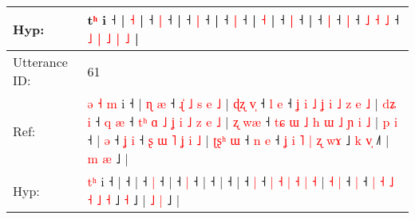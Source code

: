 \documentclass[10pt]{article}
\DeclareRobustCommand{\hl}[1]{{\textcolor{red}{#1}}}
\begin{document}
\begin{longtable}{ll}
 \\
Hyp: & \hl{}\hl{}\hl{}\hl{}\hl{}\hl{}\hl{}\hl{}\hl{}\hl{}\hl{}\hl{}\hl{}\hl{}\hl{}\hl{}\hl{}\hl{}\hl{}\hl{}\hl{}\hl{}t\hl{}\hl{}\hl{}\hl{}\hl{}\hl{}\hl{ʰ} i ˧\hl{}\hl{}\hl{}\hl{}\hl{}\hl{}\hl{}\hl{}\hl{}\hl{}\hl{}\hl{}\hl{}\hl{}\hl{}\hl{}\hl{}\hl{} |\hl{}\hl{}\hl{}\hl{}\hl{}\hl{}\hl{}\hl{} \hl{˧} |\hl{}\hl{}\hl{}\hl{}\hl{}\hl{} ˧\hl{}\hl{} \hl{|} ˧ |\hl{}\hl{}\hl{}\hl{} ˧\hl{}\hl{} \hl{}\hl{|} ˧ |\hl{}\hl{}\hl{}\hl{} ˧\hl{}\hl{} \hl{|} ˧\hl{}\hl{}\hl{}\hl{}\hl{} |\hl{}\hl{}\hl{}\hl{}\hl{}\hl{}\hl{}\hl{}\hl{}\hl{}\hl{}\hl{}\hl{}\hl{}\hl{}\hl{}\hl{} \hl{˧} |\hl{}\hl{}\hl{}\hl{} ˧\hl{}\hl{} \hl{|} ˧\hl{}\hl{}\hl{}\hl{}\hl{} |\hl{}\hl{}\hl{}\hl{}\hl{} ˧\hl{}\hl{}\hl{} \hl{}\hl{|} ˧\hl{}\hl{} \hl{}\hl{|} ˧ \hl{˩} \hl{˧} \hl{˩} ˧ \hl{˩} \hl{|} \hl{˩} \hl{}\hl{|} \hl{˩} |
 \\
\midrule
Utterance ID: & 61 \\
Ref: & \hl{ə}\hl{ }\hl{˧}\hl{ }\hl{m} i ˧ |\hl{ }\hl{ɳ}\hl{ }\hl{æ} ˧\hl{ }\hl{ɻ}\hl{̍}\hl{ }\hl{˩}\hl{ }\hl{s}\hl{ }\hl{e}\hl{ }\hl{˩} |\hl{ }\hl{ɖ}\hl{ʐ}\hl{ }\hl{v}\hl{̩} ˧\hl{ }\hl{l} \hl{e} ˧\hl{ }\hl{ʝ}\hl{ }\hl{i}\hl{ }\hl{˩}\hl{ }\hl{ʝ}\hl{ }\hl{i}\hl{ }\hl{˩}\hl{ }\hl{z}\hl{ }\hl{e}\hl{ }\hl{˩} |\hl{ }\hl{d}\hl{ʑ}\hl{ }\hl{i} ˧\hl{ }\hl{q} \hl{æ} ˧\hl{ }\hl{t}\hl{ʰ}\hl{ }\hl{ɑ}\hl{ }\hl{˩}\hl{ }\hl{ʝ}\hl{ }\hl{i}\hl{ }\hl{˩}\hl{ }\hl{z}\hl{ }\hl{e}\hl{ }\hl{˩} |\hl{ }\hl{ʐ}\hl{ }\hl{w}\hl{æ} ˧\hl{ }\hl{t}\hl{ɕ}\hl{ }\hl{ɯ}\hl{ }\hl{˩}\hl{ }\hl{h}\hl{ }\hl{ɯ}\hl{ }\hl{˩}\hl{ }\hl{ɲ}\hl{ }\hl{i}\hl{ }\hl{˩} |\hl{ }\hl{p}\hl{ }\hl{i} ˧ |\hl{ }\hl{ə} ˧\hl{ }\hl{ʝ} \hl{i} ˧ \hl{ʂ} \hl{ɯ} \hl{˥} \hl{ʝ} \hl{i} \hl{˩} | \hl{ʈ}\hl{ʂ}\hl{ʰ} \hl{ɯ} ˧\hl{ }\hl{n} \hl{e} ˧ \hl{ʝ} \hl{i} \hl{˥} \hl{|} \hl{ʐ} \hl{w}\hl{ɤ} ˩\hl{ }\hl{k} \hl{v}\hl{̩} ˩\hl{˥} | \hl{m} \hl{æ} ˩ |
 \\
Hyp: & \hl{}\hl{}\hl{}\hl{t}\hl{ʰ} i ˧ |\hl{}\hl{}\hl{}\hl{} ˧\hl{}\hl{}\hl{}\hl{}\hl{}\hl{}\hl{}\hl{}\hl{}\hl{}\hl{} |\hl{}\hl{}\hl{}\hl{}\hl{}\hl{} ˧\hl{}\hl{} \hl{|} ˧\hl{}\hl{}\hl{}\hl{}\hl{}\hl{}\hl{}\hl{}\hl{}\hl{}\hl{}\hl{}\hl{}\hl{}\hl{}\hl{}\hl{}\hl{} |\hl{}\hl{}\hl{}\hl{}\hl{} ˧\hl{}\hl{} \hl{|} ˧\hl{}\hl{}\hl{}\hl{}\hl{}\hl{}\hl{}\hl{}\hl{}\hl{}\hl{}\hl{}\hl{}\hl{}\hl{}\hl{}\hl{}\hl{}\hl{} |\hl{}\hl{}\hl{}\hl{}\hl{} ˧\hl{}\hl{}\hl{}\hl{}\hl{}\hl{}\hl{}\hl{}\hl{}\hl{}\hl{}\hl{}\hl{}\hl{}\hl{}\hl{}\hl{}\hl{}\hl{} |\hl{}\hl{}\hl{}\hl{} ˧ |\hl{}\hl{} ˧\hl{}\hl{} \hl{|} ˧ \hl{|} \hl{˧} \hl{|} \hl{˧} \hl{|} \hl{˧} | \hl{}\hl{}\hl{˧} \hl{|} ˧\hl{}\hl{} \hl{|} ˧ \hl{|} \hl{˧} \hl{˩} \hl{˧} \hl{˩} \hl{}\hl{˧} ˩\hl{}\hl{} \hl{}\hl{˧} ˩\hl{} | \hl{˩} \hl{|} ˩ |

\end{longtable}
\end{document}
